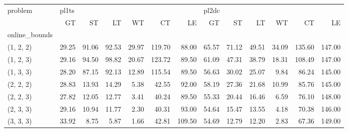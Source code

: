 \begin{tabular}{lrrrrrrrrrrrr}
\toprule
problem & \multicolumn{6}{l}{pl1ts} & \multicolumn{6}{l}{pl2dc} \\
{} &    GT &    ST &    LT &    WT &     CT &     LE &    GT &    ST &    LT &    WT &     CT &     LE \\
online\_bounds &       &       &       &       &        &        &       &       &       &       &        &        \\
\midrule
(1, 2, 2)     & 29.25 & 91.06 & 92.53 & 29.97 & 119.70 &  88.00 & 65.57 & 71.12 & 49.51 & 34.09 & 135.60 & 147.00 \\
(1, 2, 3)     & 29.16 & 94.50 & 98.82 & 20.67 & 123.72 &  89.50 & 61.09 & 47.31 & 38.79 & 18.31 & 108.49 & 147.00 \\
(1, 3, 3)     & 28.20 & 87.15 & 92.13 & 12.89 & 115.54 &  89.50 & 56.63 & 30.02 & 25.07 &  9.84 &  86.24 & 145.00 \\
(2, 2, 2)     & 28.83 & 13.93 & 14.29 &  5.38 &  42.55 &  92.00 & 58.19 & 27.36 & 21.68 & 10.99 &  85.76 & 145.00 \\
(2, 2, 3)     & 27.82 & 12.05 & 12.77 &  3.41 &  40.24 &  89.50 & 55.33 & 20.44 & 16.46 &  6.59 &  76.10 & 148.00 \\
(2, 3, 3)     & 29.16 & 10.94 & 11.77 &  2.30 &  40.31 &  93.00 & 54.64 & 15.47 & 13.55 &  4.18 &  70.38 & 146.00 \\
(3, 3, 3)     & 33.92 &  8.75 &  5.87 &  1.66 &  42.81 & 109.50 & 54.69 & 12.79 & 12.20 &  2.83 &  67.36 & 149.00 \\
\bottomrule
\end{tabular}
